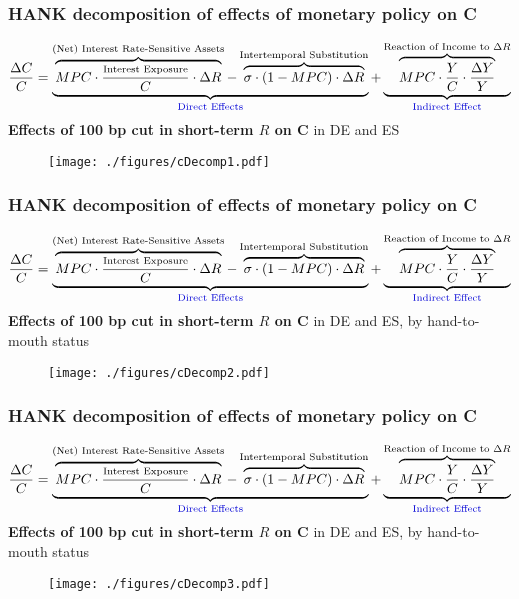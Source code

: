 \documentclass[pdflatex,aspectratio=169]{beamer}
\newcommand{\jemph}[1]{{\color{StataDarkBlue}#1}}
\newcommand{\jbemph}[1]{\textbf{\color{SlideNavy}#1}}
\begin{document}
\begin{frame}\frametitle{\bf HANK decomposition of effects of monetary policy on C}
\vspace*{-2.5mm}
\footnotesize
$$
\frac{\Delta C}{C}=\underbrace{\overbrace{MPC\cdot\frac{\text{\scriptsize{Interest Exposure}}}{C}\cdot\Delta R}^{\text{(Net) Interest Rate-Sensitive Assets}}-\overbrace{\sigma\cdot(1-MPC)\cdot\Delta R}^{\text{Intertemporal Substitution}}}_{\text{\jemph{Direct Effects}}}+\underbrace{\overbrace{MPC\cdot\frac{Y}{C}\cdot\frac{\Delta Y}{Y}}^{\text{Reaction of Income to $\Delta R$}}}_{\text{\jemph{Indirect Effect}}}
$$
\small
\jbemph{Effects of 100 bp cut in short-term $R$ on C} in DE and ES
\begin{figure}
\begin{center}
\texttt{[image: ./figures/cDecomp1.pdf]}
\end{center}
\end{figure}
\end{frame}



\begin{frame}\frametitle{\bf HANK decomposition of effects of monetary policy on C}
\vspace*{-2.5mm}
\footnotesize
$$
\frac{\Delta C}{C}=\underbrace{\overbrace{MPC\cdot\frac{\text{\scriptsize{Interest Exposure}}}{C}\cdot\Delta R}^{\text{(Net) Interest Rate-Sensitive Assets}}-\overbrace{\sigma\cdot(1-MPC)\cdot\Delta R}^{\text{Intertemporal Substitution}}}_{\text{\jemph{Direct Effects}}}+\underbrace{\overbrace{MPC\cdot\frac{Y}{C}\cdot\frac{\Delta Y}{Y}}^{\text{Reaction of Income to $\Delta R$}}}_{\text{\jemph{Indirect Effect}}}
$$
\small
\jbemph{Effects of 100 bp cut in short-term $R$ on C} in DE and ES, by hand-to-mouth status 
\begin{figure}
\begin{center}
\texttt{[image: ./figures/cDecomp2.pdf]}
\end{center}
\end{figure}
\end{frame}



\begin{frame}\frametitle{\bf HANK decomposition of effects of monetary policy on C}
\vspace*{-2.5mm}
\footnotesize
$$
\frac{\Delta C}{C}=\underbrace{\overbrace{MPC\cdot\frac{\text{\scriptsize{Interest Exposure}}}{C}\cdot\Delta R}^{\text{(Net) Interest Rate-Sensitive Assets}}-\overbrace{\sigma\cdot(1-MPC)\cdot\Delta R}^{\text{Intertemporal Substitution}}}_{\text{\jemph{Direct Effects}}}+\underbrace{\overbrace{MPC\cdot\frac{Y}{C}\cdot\frac{\Delta Y}{Y}}^{\text{Reaction of Income to $\Delta R$}}}_{\text{\jemph{Indirect Effect}}}
$$
\small
\jbemph{Effects of 100 bp cut in short-term $R$ on C} in DE and ES, by hand-to-mouth status 
\begin{figure}
\begin{center}
\texttt{[image: ./figures/cDecomp3.pdf]}
\end{center}
\end{figure}
\end{frame}
\end{document}
